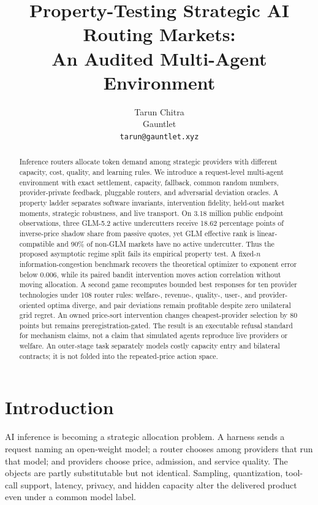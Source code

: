\documentclass[10pt]{article}
\title{Property-Testing Strategic AI Routing Markets:\\
An Audited Multi-Agent Environment}
\author{Tarun Chitra\\Gauntlet\\\texttt{tarun@gauntlet.xyz}}
\date{}
\newcommand{\1}{\mathbf 1}
\begin{document}
\maketitle

\begin{abstract}
Inference routers allocate token demand among strategic providers with
different capacity, cost, quality, and learning rules.  We introduce a
request-level multi-agent environment with exact settlement, capacity, fallback,
common random numbers, provider-private feedback, pluggable routers, and
adversarial deviation oracles.  A property ladder separates software invariants,
intervention fidelity, held-out market moments, strategic robustness, and live
transport.  On 3.18 million public endpoint observations, three GLM-5.2 active
undercutters receive 18.62 percentage points of inverse-price shadow share from
passive quotes, yet GLM effective rank is linear-compatible and 90\% of non-GLM
markets have no active undercutter.  Thus the proposed asymptotic regime split
fails its empirical property test.  A fixed-$n$ information-congestion benchmark
recovers the theoretical optimizer to exponent error below 0.006, while its
paired bandit intervention moves action correlation without moving allocation.
A second game recomputes bounded best responses for ten provider technologies
under 108 router rules: welfare-, revenue-, quality-, user-, and
provider-oriented optima diverge, and pair deviations remain profitable despite
zero unilateral grid regret.  An owned price-sort intervention changes
cheapest-provider selection by 80 points but remains preregistration-gated.
The result is an executable refusal standard for mechanism claims, not a claim
that simulated agents reproduce live providers or welfare.
An outer-stage task separately models costly capacity entry and bilateral
contracts; it is not folded into the repeated-price action space.
\end{abstract}

\section{Introduction}

AI inference is becoming a strategic allocation problem.  A harness sends a
request naming an open-weight model; a router chooses among providers that run
that model; and providers choose price, admission, and service quality.  The
objects are partly substitutable but not identical.  Sampling, quantization,
tool-call support, latency, privacy, and hidden capacity alter the delivered
product even under a common model label.
\end{document}
